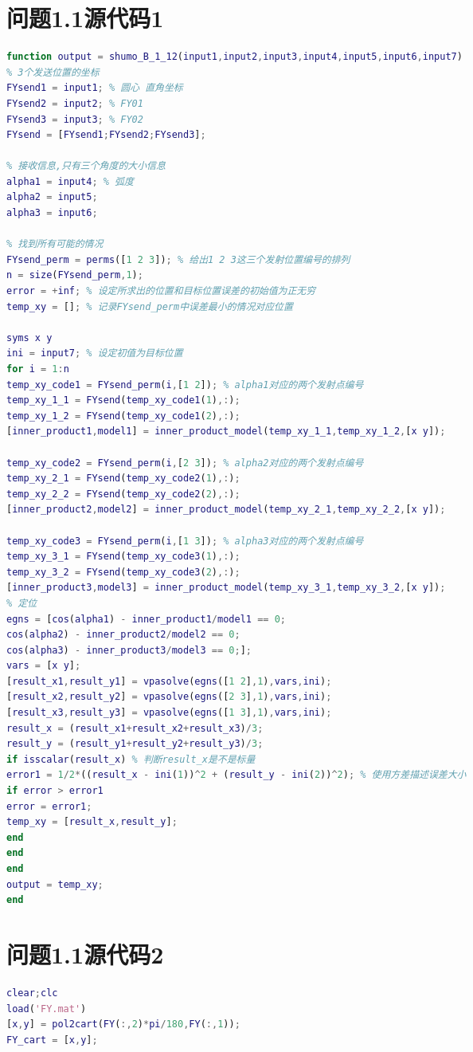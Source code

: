 \documentclass[12pt]{ctexart}
\begin{document}
\begin{spacing}{1.5}
\section{问题1.1源代码1}
\begin{lstlisting}[title="shumo\_B\_1\_12.m",language=matlab]
function output = shumo_B_1_12(input1,input2,input3,input4,input5,input6,input7)
% 3个发送位置的坐标
FYsend1 = input1; % 圆心 直角坐标
FYsend2 = input2; % FY01
FYsend3 = input3; % FY02
FYsend = [FYsend1;FYsend2;FYsend3];

% 接收信息,只有三个角度的大小信息
alpha1 = input4; % 弧度
alpha2 = input5;
alpha3 = input6;

% 找到所有可能的情况
FYsend_perm = perms([1 2 3]); % 给出1 2 3这三个发射位置编号的排列
n = size(FYsend_perm,1);
error = +inf; % 设定所求出的位置和目标位置误差的初始值为正无穷
temp_xy = []; % 记录FYsend_perm中误差最小的情况对应位置

syms x y
ini = input7; % 设定初值为目标位置
for i = 1:n
temp_xy_code1 = FYsend_perm(i,[1 2]); % alpha1对应的两个发射点编号
temp_xy_1_1 = FYsend(temp_xy_code1(1),:);
temp_xy_1_2 = FYsend(temp_xy_code1(2),:);
[inner_product1,model1] = inner_product_model(temp_xy_1_1,temp_xy_1_2,[x y]);

temp_xy_code2 = FYsend_perm(i,[2 3]); % alpha2对应的两个发射点编号
temp_xy_2_1 = FYsend(temp_xy_code2(1),:);
temp_xy_2_2 = FYsend(temp_xy_code2(2),:);
[inner_product2,model2] = inner_product_model(temp_xy_2_1,temp_xy_2_2,[x y]);

temp_xy_code3 = FYsend_perm(i,[1 3]); % alpha3对应的两个发射点编号
temp_xy_3_1 = FYsend(temp_xy_code3(1),:);
temp_xy_3_2 = FYsend(temp_xy_code3(2),:);
[inner_product3,model3] = inner_product_model(temp_xy_3_1,temp_xy_3_2,[x y]);
% 定位
egns = [cos(alpha1) - inner_product1/model1 == 0;
cos(alpha2) - inner_product2/model2 == 0;
cos(alpha3) - inner_product3/model3 == 0;];
vars = [x y];
[result_x1,result_y1] = vpasolve(egns([1 2],1),vars,ini);
[result_x2,result_y2] = vpasolve(egns([2 3],1),vars,ini);
[result_x3,result_y3] = vpasolve(egns([1 3],1),vars,ini);
result_x = (result_x1+result_x2+result_x3)/3;
result_y = (result_y1+result_y2+result_y3)/3;
if isscalar(result_x) % 判断result_x是不是标量
error1 = 1/2*((result_x - ini(1))^2 + (result_y - ini(2))^2); % 使用方差描述误差大小
if error > error1
error = error1;
temp_xy = [result_x,result_y];
end
end
end
output = temp_xy;
end
\end{lstlisting}

\section{问题1.1源代码2}
\begin{lstlisting}[title="shumo\_B\_1\_12\_test.m",language=matlab]
%% 数据导入
clear;clc
load('FY.mat')
[x,y] = pol2cart(FY(:,2)*pi/180,FY(:,1));
FY_cart = [x,y];


\end{lstlisting}
\end{spacing}
\end{document}
